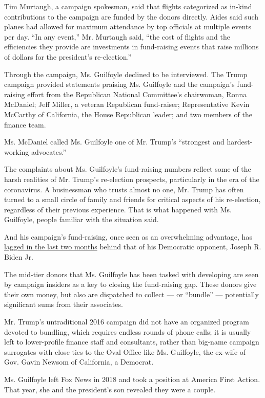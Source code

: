 Tim Murtaugh, a campaign spokesman, said that flights categorized as
in-kind contributions to the campaign are funded by the donors directly.
Aides said such planes had allowed for maximum attendance by top
officials at multiple events per day. ``In any event,'' Mr. Murtaugh
said, ``the cost of flights and the efficiencies they provide are
investments in fund-raising events that raise millions of dollars for
the president's re-election.''

Through the campaign, Ms. Guilfoyle declined to be interviewed. The
Trump campaign provided statements praising Ms. Guilfoyle and the
campaign's fund-raising effort from the Republican National Committee's
chairwoman, Ronna McDaniel; Jeff Miller, a veteran Republican
fund-raiser; Representative Kevin McCarthy of California, the House
Republican leader; and two members of the finance team.

Ms. McDaniel called Ms. Guilfoyle one of Mr. Trump's ``strongest and
hardest-working advocates.''

The complaints about Ms. Guilfoyle's fund-raising numbers reflect some
of the harsh realities of Mr. Trump's re-election prospects,
particularly in the era of the coronavirus. A businessman who trusts
almost no one, Mr. Trump has often turned to a small circle of family
and friends for critical aspects of his re-election, regardless of their
previous experience. That is what happened with Ms. Guilfoyle, people
familiar with the situation said.

And his campaign's fund-raising, once seen as an overwhelming advantage,
has
\href{https://www.nytimes.com/2020/07/01/us/politics/trump-fundraising-2020.html}{lagged
in the last two months} behind that of his Democratic opponent, Joseph
R. Biden Jr.

The mid-tier donors that Ms. Guilfoyle has been tasked with developing
are seen by campaign insiders as a key to closing the fund-raising gap.
These donors give their own money, but also are dispatched to collect
--- or ``bundle'' --- potentially significant sums from their
associates.

Mr. Trump's untraditional 2016 campaign did not have an organized
program devoted to bundling, which requires endless rounds of phone
calls; it is usually left to lower-profile finance staff and
consultants, rather than big-name campaign surrogates with close ties to
the Oval Office like Ms. Guilfoyle, the ex-wife of Gov. Gavin Newsom of
California, a Democrat.

Ms. Guilfoyle left Fox News in 2018 and took a position at America First
Action. That year, she and the president's son revealed they were a
couple.

